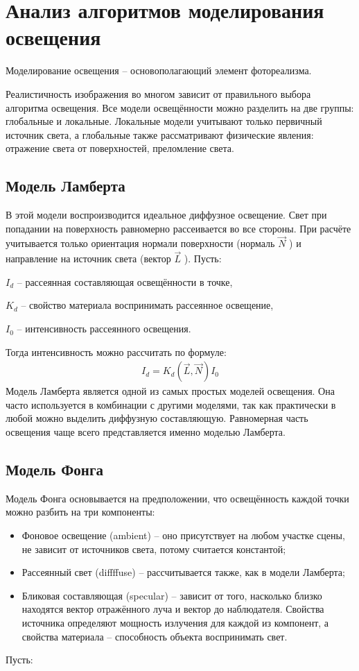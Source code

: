 \section{Анализ алгоритмов моделирования освещения}
Моделирование освещения – основополагающий элемент фотореализма.

Реалистичность изображения во многом зависит от правильного выбора алгоритма освещения. Все модели освещённости можно разделить на две группы: глобальные и локальные. Локальные модели учитывают только первичный источник света, а глобальные также рассматривают физические явления: отражение света от поверхностей, преломление света.
	\subsection{Модель Ламберта}
	В этой модели воспроизводится идеальное диффузное освещение. Свет при попадании на поверхность равномерно рассеивается во все стороны. При расчёте учитывается только ориентация нормали поверхности (нормаль $\vec{N}$ ) и направление на источник света (вектор $\vec{L}$ ). Пусть:
	
	$I_d$ – рассеянная составляющая освещённости в точке, 
	
	$K_d$ – свойство материала воспринимать рассеянное освещение, 
	
	$I_0$ – интенсивность рассеянного освещения.
	
	Тогда интенсивность можно рассчитать по формуле:
	\begin{align}
	I_d = K_d(\vec{L}, \vec{N})I_0
	\end{align}
	Модель Ламберта является одной из самых простых моделей освещения. Она часто используется в комбинации с другими моделями, так как практически в любой можно выделить диффузную составляющую. Равномерная часть освещения чаще всего представляется именно моделью Ламберта.
	\subsection{Модель Фонга}
	Модель Фонга основывается на предположении, что освещённость каждой точки можно разбить на три компоненты:
	\begin{itemize} 
	\item Фоновое освещение (ambient) -- оно присутствует на любом участке сцены, не зависит от источников света, потому считается константой;
	\item Рассеянный свет (diffffuse) -- рассчитывается также, как в модели Ламберта;
	\item Бликовая составляющая (specular) – зависит от того, насколько близко находятся вектор отражённого луча и вектор до наблюдателя. Свойства источника определяют мощность излучения для каждой из компонент, а свойства материала -- способность объекта воспринимать свет.
	\end{itemize}
	Пусть:
	
